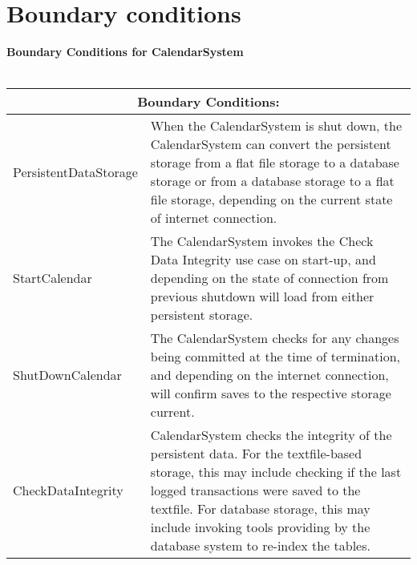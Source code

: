 \section{Boundary conditions}
\textbf{Boundary Conditions for CalendarSystem}\\\\
\begin{tabular}{ |l|p{10cm}| }
  \hline
  \multicolumn{2}{|c|}{Boundary Conditions:} \\
  \hline
  PersistentDataStorage & When the CalendarSystem is shut down, the CalendarSystem can convert the persistent storage from a flat file storage to a database storage or from a database storage to a flat file storage, depending on the current state of internet connection.\\
  \hline
    StartCalendar & The CalendarSystem invokes the Check Data Integrity use case on start-up, and depending on the state of connection from previous shutdown will load from either persistent storage.\\
    \hline
    ShutDownCalendar & The CalendarSystem checks for any changes being committed at the time of termination, and depending on the internet connection, will confirm saves to the respective storage current. \\
    \hline
    CheckDataIntegrity & CalendarSystem checks the integrity of the persistent data. For the textfile-based storage, this may include checking if the last logged transactions were saved to the textfile. For database storage, this may include invoking tools providing by the database system to re-index the tables. \\
  \hline
\end{tabular}